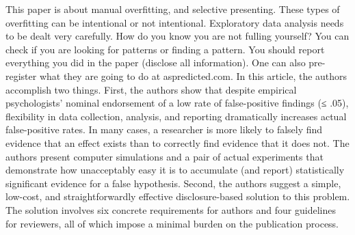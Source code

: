 This paper is about manual overfitting, and selective presenting. These types of overfitting can be intentional or not intentional. Exploratory data analysis needs to be dealt very carefully. How do you know you are not fulling yourself? You can check if you are looking for patterns or finding a pattern. You should report everything you did in the paper (disclose all information). One can also pre-register what they are going to do at aspredicted.com. In this article, the authors accomplish two things. First, the authors show that despite empirical psychologists’ nominal endorsement of a low rate of false-positive findings (≤ .05), flexibility in data collection, analysis, and reporting dramatically increases actual false-positive rates. In many cases, a researcher is more likely to falsely find evidence that an effect exists than to correctly find evidence that it does not. The authors  present computer simulations and a pair of actual experiments that demonstrate how unacceptably easy it is to accumulate (and report) statistically significant evidence for a false hypothesis. Second, the authors suggest a simple, low-cost, and straightforwardly effective disclosure-based solution to this problem. The solution involves six concrete requirements for authors and four guidelines for reviewers, all of which impose a minimal burden on the publication process.\\